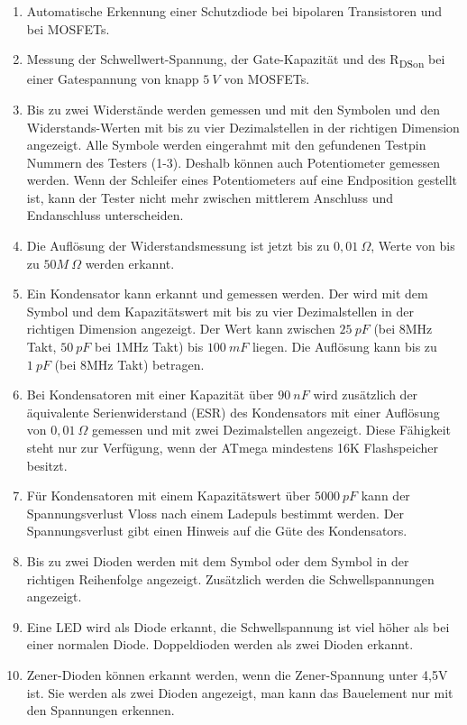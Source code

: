 \begin{enumerate}
\item Automatische Erkennung einer Schutzdiode bei bipolaren Transistoren und bei MOSFETs.
\item Messung der Schwellwert-Spannung, der Gate-Kapazität  und des R\textsubscript{DSon} bei einer Gatespannung von knapp \(5~V\) von MOSFETs.
\item Bis zu zwei Widerstände werden gemessen und mit den \mbox{\electricR} Symbolen
und den Widerstands-Werten mit bis zu vier Dezimalstellen in der richtigen Dimension angezeigt.
Alle Symbole werden eingerahmt mit den gefundenen Testpin Nummern des Testers (1-3).
Deshalb können auch Potentiometer gemessen werden. Wenn der Schleifer eines Potentiometers auf eine Endposition
gestellt ist, kann der Tester nicht mehr zwischen mittlerem Anschluss und Endanschluss unterscheiden.
\item Die Auflösung der Widerstandsmessung ist jetzt bis zu \(0,01~\Omega\), Werte von bis zu \(50M~\Omega\) werden erkannt.
\item Ein Kondensator kann erkannt und gemessen werden. Der wird mit dem Symbol \mbox{\electricC}
und dem Kapazitätswert mit bis zu vier Dezimalstellen in der richtigen Dimension angezeigt.
Der Wert kann zwischen \(25~pF\) (bei 8MHz Takt, \(50~pF\) bei 1MHz Takt) bis \(100~mF\) liegen. Die Auflösung kann bis zu \(1~pF\) (bei 8MHz Takt) betragen.
\item Bei Kondensatoren mit einer Kapazität über \(90~nF\) wird zusätzlich der äquivalente Serienwiderstand (ESR) des Kondensators
mit einer Auflösung von \(0,01~\Omega\) gemessen und mit zwei Dezimalstellen angezeigt.
Diese Fähigkeit steht nur zur Verfügung, wenn der ATmega mindestens 16K Flashspeicher besitzt.
\item Für Kondensatoren mit einem Kapazitätswert über \(5000~pF\) kann der Spannungsverlust Vloss nach einem Ladepuls bestimmt werden.
Der Spannungsverlust gibt einen Hinweis auf die Güte des Kondensators.
\item Bis zu zwei Dioden werden mit dem Symbol \mbox{\electricDAK} oder dem Symbol \mbox{\electricDKA}
in der richtigen Reihenfolge angezeigt.
Zusätzlich werden die Schwellspannungen angezeigt.
\item Eine LED wird als Diode erkannt, die Schwellspannung ist viel höher als bei einer normalen Diode.
Doppeldioden werden als zwei Dioden erkannt.
\item Zener-Dioden können erkannt werden, wenn die Zener-Spannung unter 4,5V ist.
Sie werden als zwei Dioden angezeigt, man kann das Bauelement nur mit den Spannungen erkennen.

\end{enumerate}
